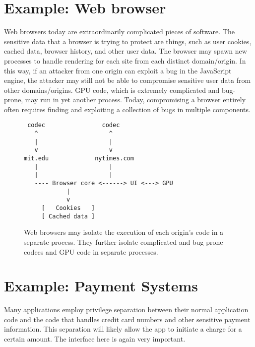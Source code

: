 \section{Example: Web browser}

Web browsers today are extraordinarily complicated pieces of software.
The sensitive data that a browser is trying to protect are things, such as
user cookies, cached data, browser history, and other user data.
The browser may spawn new processes to handle rendering for each site
from each distinct domain/origin.
In this way, if an attacker from one origin can exploit a bug in the
JavaScript engine, the attacker may still not be able to compromise
sensitive user data from other domains/origins.
GPU code, which is extremely complicated and bug-prone, may run in 
yet another process.
Today, compromising a browser entirely often requires finding and exploiting
a collection of bugs in multiple components.
\begin{figure}
\begin{verbatim}
 codec                codec
   ^                    ^
   |                    |
   v                    v
mit.edu             nytimes.com
   |                    |
   |                    | 
   ---- Browser core <------> UI <---> GPU
            |
            v
     [   Cookies   ]
     [ Cached data ]
\end{verbatim}
\caption{Web browsers may isolate the execution of each origin's 
  code in a separate process. They further isolate complicated
  and bug-prone codecs and GPU code in separate processes.}
\end{figure}

\section{Example: Payment Systems}
Many applications employ privilege separation between their normal application code and the code that handles credit card numbers and other sensitive payment information. This separation will likely allow the app to initiate a charge for a certain amount. The interface here is again very important.
